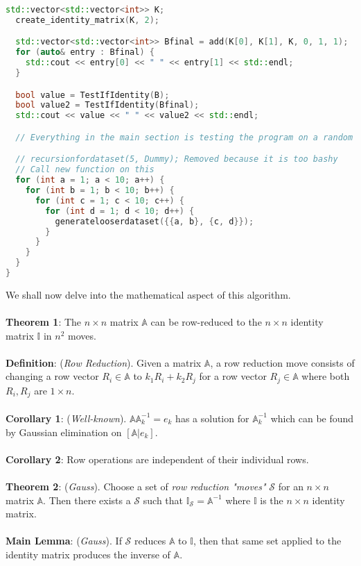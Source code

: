 \documentclass{article}
\begin{document}
\begin{lstlisting}[language=C++]
  std::vector<std::vector<int>> K;
  create_identity_matrix(K, 2);

  std::vector<std::vector<int>> Bfinal = add(K[0], K[1], K, 0, 1, 1);
  for (auto& entry : Bfinal) {
    std::cout << entry[0] << " " << entry[1] << std::endl;
  }

  bool value = TestIfIdentity(B);
  bool value2 = TestIfIdentity(Bfinal);
  std::cout << value << " " << value2 << std::endl;

  // Everything in the main section is testing the program on a random scenario.

  // recursionfordataset(5, Dummy); Removed because it is too bashy
  // Call new function on this
  for (int a = 1; a < 10; a++) {
    for (int b = 1; b < 10; b++) {
      for (int c = 1; c < 10; c++) {
        for (int d = 1; d < 10; d++) {
          generatelooserdataset({{a, b}, {c, d}});
        }
      }
    }
  }
}
\end{lstlisting}
We shall now delve into the mathematical aspect of this algorithm. \\ \\
\textbf{Theorem 1}: The $n\times n$ matrix $\mathbb{A}$ can be row-reduced to the $n\times n$ identity matrix $\mathbb{I}$ in $n^2$ moves. \\ \\
\textbf{Definition}: (\textit{Row Reduction}). Given a matrix $\mathbb{A}$, a row reduction move consists of changing a row vector $R_i\in\mathbb{A}$ to $k_1R_i+k_2R_j$ for a row vector $R_j\in \mathbb{A}$ where both $R_i, R_j$ are $1\times n$. \\ \\
\textbf{Corollary 1}: (\textit{Well-known}). $\mathbb{A}\mathbb{A}_k^{-1}=e_k$ has a solution for $\mathbb{A}_k^{-1}$ which can be found by Gaussian elimination on $[\mathbb{A}|e_k]$. \\ \\
\textbf{Corollary 2}: Row operations are independent of their individual rows. \\ \\
\textbf{Theorem 2}: (\textit{Gauss}). Choose a set of \textit{row reduction "moves"} $\mathcal{S}$ for an $n\times n$ matrix $\mathbb{A}$. Then there exists a $\mathcal{S}$ such that $ \mathbb{I}_{\mathcal{S}}=\mathbb{A}^{-1}$ where $\mathbb{I}$ is the $n\times n$ identity matrix. \\ \\
\textbf{Main Lemma}: (\textit{Gauss}). If $\mathcal{S}$ reduces $\mathbb{A}$ to $\mathbb{I}$, then that same set applied to the identity matrix produces the inverse of $\mathbb{A}$. \\ 
\end{document}
